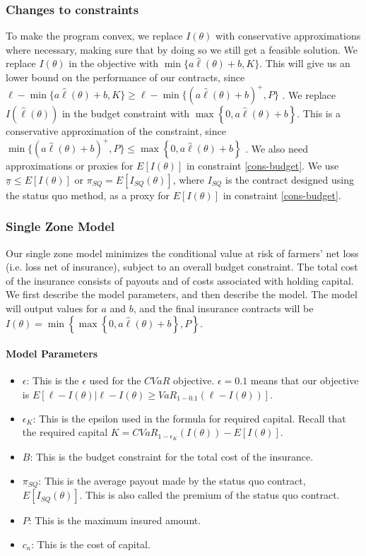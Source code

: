 \documentclass[11pt]{article}
\begin{document}
  \subsubsection{Changes to constraints}
  To make the program convex, we replace $I(\theta)$ with conservative approximations where necessary, making sure that by doing so we still get a feasible solution. We replace $I(\theta)$ in the objective with $\min \{ a\hat{\ell}(\theta) + b,K \}$. This will give us an lower bound on the performance of our contracts, since $\ell - \min \{ a\hat{\ell}(\theta) + b,K \} \geq  \ell - \min \{ (a\hat{\ell}(\theta) + b)^+,P \}$ . We replace $I(\hat{\ell}(\theta))$ in the budget constraint with $\max \left \{ 0,a\hat{\ell}(\theta) + b \right \} $. This is a conservative approximation of the constraint, since $\min \{ (a\hat{\ell}(\theta) + b)^+,P \}  \leq \max \left \{ 0,a\hat{\ell}(\theta) + b \right \}$ . We also need approximations or proxies for $E[I(\theta)]$ in constraint \ref{cons-budget}. We use $\underline{\pi} \leq E[I(\theta)]$ or $\pi_{SQ} = E[I_{SQ}(\theta)]$, where $I_{SQ}$ is the contract designed using the status quo method, as a proxy for $E[I(\theta)]$ in constraint \ref{cons-budget}. 
  
  \subsubsection{Single Zone Model}
  Our single zone model minimizes the conditional value at risk of farmers' net loss (i.e. loss net of insurance), subject to an overall budget constraint. The total cost of the insurance consists of payouts and of costs associated with holding capital. We first describe the model parameters, and then describe the model. The model will output values for $a$ and $b$, and the final insurance contracts will be $I(\theta) = \min \left \{\max \left \{0,a\hat{\ell}(\theta) + b \right \}, P \right \}$.
  \paragraph*{Model Parameters}
  \begin{itemize}
    \item $\epsilon$: This is the $\epsilon$ used for the $CVaR$ objective.  $\epsilon = 0.1$ means that our objective is $E[\ell - I(\theta)|\ell -I(\theta) \geq VaR_{1-0.1}\left ( \ell - I(\theta) \right )]$. 
    \item $\epsilon_K$: This is the epsilon used in the formula for required capital. Recall that the required capital $K = CVaR_{1-\epsilon_K}(I(\theta)) - E[I(\theta)]$.
    \item $B$: This is the budget constraint for the total cost of the insurance.
    \item $\pi_{SQ}$: This is the average payout made by the status quo contract, $E[I_{SQ}(\theta)]$. This is also called the premium of the status quo contract.  
    \item $P$: This is the maximum insured amount.
    \item $c_{\kappa}$: This is the cost of capital. 
\end{itemize}
  
\end{document}
